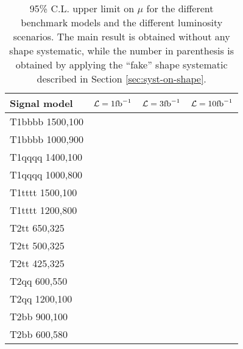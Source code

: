 \begin{table}
  \centering
  \caption{95\% C.L. upper limit on $\mu$ for the different benchmark models and the different luminosity scenarios. 
  The main result is obtained without any shape systematic, while the number in parenthesis is obtained by applying 
  the ``fake'' shape systematic described in Section \ref{sec:syst-on-shape}.}
  \label{tab:results_ul}
  \footnotesize
  \begin{tabular}{lccc}
    \hline
    \hline
    Signal model & $\mathcal{L} = 1 \ifb$ & $\mathcal{L} = 3 \ifb$ & $\mathcal{L} = 10 \ifb$ \\
    \hline
    \hline
    T1bbbb 1500,100 &   &   &   \\
    T1bbbb 1000,900 &   &   &   \\
    T1qqqq 1400,100 &   &   &   \\
    T1qqqq 1000,800 &   &   &   \\
    T1tttt 1500,100 &   &   &   \\
    T1tttt 1200,800 &   &   &   \\
    T2tt 650,325    &   &   &   \\
    T2tt 500,325    &   &   &   \\
    T2tt 425,325    &   &   &   \\
    T2qq 600,550    &   &   &   \\
    T2qq 1200,100   &   &   &   \\
    T2bb 900,100    &   &   &   \\
    T2bb 600,580    &   &   &   \\
    \hline
    \hline
  \end{tabular} 
\end{table}


